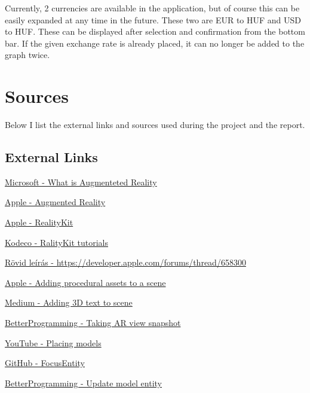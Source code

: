 \documentclass{report}
\begin{document}
Currently, 2 currencies are available in the application, but of course this can be easily expanded at any time in the future. These two are EUR to HUF and USD to HUF. These can be displayed after selection and confirmation from the bottom bar. If the given exchange rate is already placed, it can no longer be added to the graph twice.


\chapter{Sources}

Below I list the external links and sources used during the project and the report.

\section{External Links}

\hyperlink{https://dynamics.microsoft.com/en-us/mixed-reality/guides/what-is-augmented-reality-ar/}{Microsoft - What is Augmenteted Reality}

\hyperlink{https://developer.apple.com/augmented-reality/}{Apple - Augmented Reality}

\hyperlink{https://developer.apple.com/documentation/realitykit/}{Apple - RealityKit}

\hyperlink{https://www.kodeco.com/books/apple-augmented-reality-by-tutorials/v1.0/chapters/iii-introduction}{Kodeco - RalityKit tutorials}

\hyperlink{https://developer.apple.com/forums/thread/658300}{Rövid leírás - https://developer.apple.com/forums/thread/658300}

\hyperlink{https://developer.apple.com/documentation/realitykit/adding-procedural-assets-to-a-scene}{Apple - Adding procedural assets to a scene}

\hyperlink{https://coledennis.medium.com/tutorial-generating-3d-text-with-realitykit-in-a-swiftui-app-fa2a50403012}{Medium - Adding 3D text to scene}

\hyperlink{https://betterprogramming.pub/take-an-arview-snapshot-in-realitykit-93b620cf99b3}{BetterProgramming - Taking AR view snapshot}

\hyperlink{https://www.youtube.com/watch?v=9R_G0EI-UoI}{YouTube - Placing models}

\hyperlink{https://github.com/maxxfrazer/FocusEntity}{GitHub - FocusEntity}

\hyperlink{https://betterprogramming.pub/how-to-add-text-to-an-arview-in-an-ios-application-tutorial-f3f746f4dc1f}{BetterProgramming - Update model entity}
\end{document}
